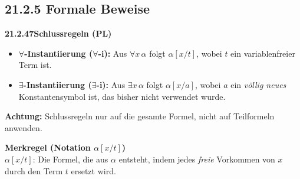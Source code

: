 \documentclass[a4paper,12pt]{article}
\newcommand{\gentry}[3]{%
  \noindent\textbf{#1\quad #2}\nopagebreak\\[0.2em]
  #3\par\smallskip
}
\begin{document}
\subsection*{21.2.5 Formale Beweise}

\gentry{21.2.47}{Schlussregeln (PL)}{%
  \begin{itemize}[topsep=2pt,itemsep=1pt]
    \item \textbf{$\forall$-Instantiierung ($\forall$-i):} Aus $\forall x\,\alpha$
          folgt $\alpha[x/t]$, wobei $t$ ein variablenfreier Term ist.
    \item \textbf{$\exists$-Instantiierung ($\exists$-i):} Aus $\exists x\,\alpha$
          folgt $\alpha[x/a]$, wobei $a$ ein \emph{völlig neues} Konstantensymbol
          ist, das bisher nicht verwendet wurde.
  \end{itemize}
  \textbf{Achtung:} Schlussregeln nur auf die gesamte Formel, nicht auf Teilformeln
  anwenden.
}

\gentry{}{Merkregel (Notation $\alpha[x/t]$)}{%
  $\alpha[x/t]$: Die Formel, die aus $\alpha$ entsteht, indem jedes
  \emph{freie} Vorkommen von $x$ durch den Term $t$ ersetzt wird.
}
\end{document}
